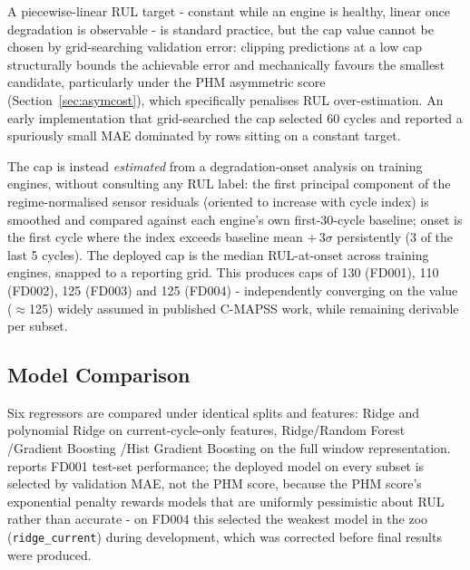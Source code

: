 \documentclass[9pt,a4paper,twocolumn,twoside]{rho-class/rho}
\begin{document}
        A piecewise-linear RUL target - constant while an engine is healthy, linear once degradation is observable - is standard practice, but the cap value cannot be chosen by grid-searching validation error: clipping predictions at a low cap structurally bounds the achievable error and mechanically favours the smallest candidate, particularly under the PHM asymmetric score (Section~\ref{sec:asymcost}), which specifically penalises RUL over-estimation. An early implementation that grid-searched the cap selected 60 cycles and reported a spuriously small MAE dominated by rows sitting on a constant target.

        The cap is instead \emph{estimated} from a degradation-onset analysis on training engines, without consulting any RUL label: the first principal component of the regime-normalised sensor residuals (oriented to increase with cycle index) is smoothed and compared against each engine's own first-30-cycle baseline; onset is the first cycle where the index exceeds baseline mean $+\,3\sigma$ persistently (3 of the last 5 cycles). The deployed cap is the median RUL-at-onset across training engines, snapped to a reporting grid. This produces caps of 130 (FD001), 110 (FD002), 125 (FD003) and 125 (FD004) - independently converging on the value ($\approx$125) widely assumed in published C-MAPSS work, while remaining derivable per subset.

    \subsection{Model Comparison}

        Six regressors are compared under identical splits and features: Ridge and polynomial Ridge on current-cycle-only features, Ridge/Random Forest \cite{breiman2001random}/Gradient Boosting \cite{friedman2001greedy}/Hist Gradient Boosting on the full window representation.  reports FD001 test-set performance; the deployed model on every subset is selected by validation MAE, not the PHM score, because the PHM score's exponential penalty rewards models that are uniformly pessimistic about RUL rather than accurate - on FD004 this selected the weakest model in the zoo (\texttt{ridge\_current}) during development, which was corrected before final results were produced.
\end{document}

